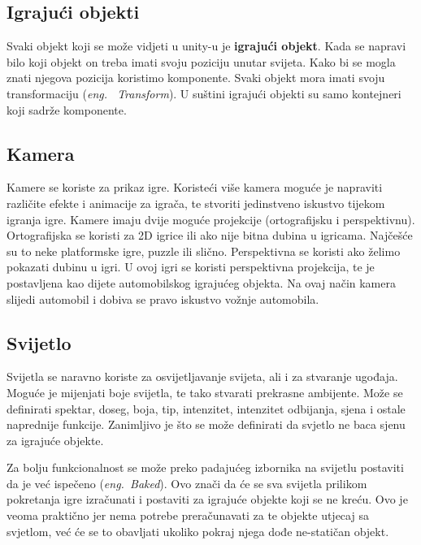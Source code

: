 \subsection{Igrajući objekti}
Svaki objekt koji se može vidjeti u unity-u je \textbf{igrajući objekt}. Kada se napravi bilo koji objekt on treba imati svoju poziciju unutar svijeta. Kako bi se mogla znati njegova pozicija koristimo komponente. Svaki objekt mora imati svoju transformaciju (\emph{eng.~ Transform}). U suštini igrajući objekti su samo kontejneri koji sadrže komponente.

\subsection{Kamera}
Kamere se koriste za prikaz igre. Koristeći više kamera moguće je napraviti različite efekte i animacije za igrača, te stvoriti jedinstveno iskustvo tijekom igranja igre. Kamere imaju dvije moguće projekcije (ortografijsku i perspektivnu). Ortografijska se koristi za 2D igrice ili ako nije bitna dubina u igricama. Najčešće su to neke platformske igre, puzzle ili slično. Perspektivna se koristi ako želimo pokazati dubinu u igri. U ovoj igri se koristi perspektivna projekcija, te je postavljena kao dijete automobilskog igrajućeg objekta. Na ovaj način kamera slijedi automobil i dobiva se pravo iskustvo vožnje automobila.
\subsection{Svijetlo}
Svijetla se naravno koriste za osvijetljavanje svijeta, ali i za stvaranje ugođaja. Moguće je mijenjati boje svijetla, te tako stvarati prekrasne ambijente. Može se definirati spektar, doseg, boja, tip, intenzitet, intenzitet odbijanja, sjena i ostale naprednije funkcije. Zanimljivo je što se može definirati da svjetlo ne baca sjenu za igrajuće objekte.

Za bolju funkcionalnost se može preko padajućeg izbornika na svijetlu postaviti da je već ispečeno (\emph{eng.~Baked}). Ovo znači da će se sva svijetla prilikom pokretanja igre izračunati i postaviti za igrajuće objekte koji se ne kreću. Ovo je veoma praktično jer nema potrebe preračunavati za te objekte utjecaj sa svjetlom, već će se to obavljati ukoliko pokraj njega dođe ne-statičan objekt.
\newpage

